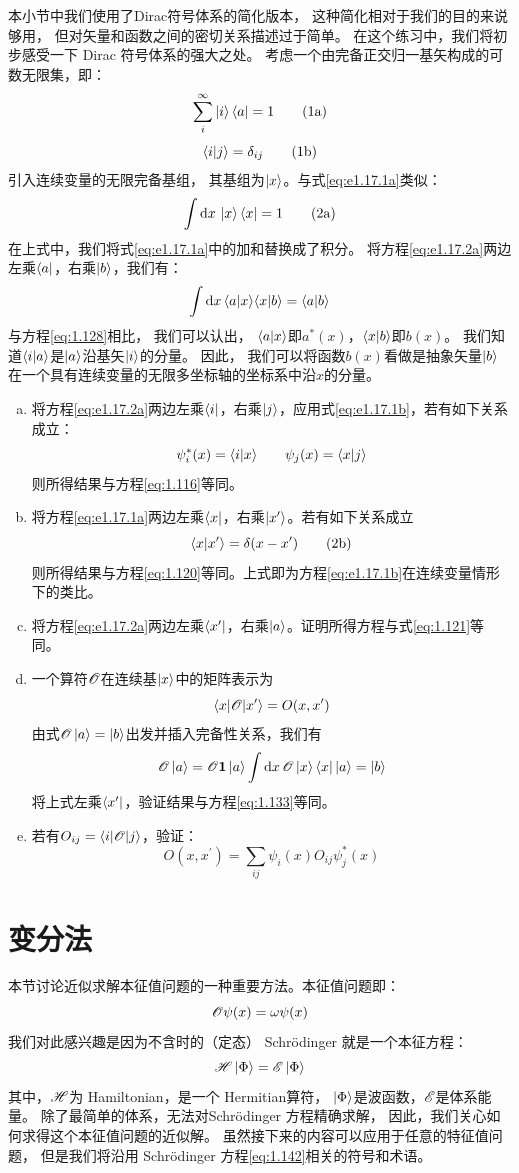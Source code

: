 { 本小节中我们使用了Dirac符号体系的简化版本，
 这种简化相对于我们的目的来说够用，
 但对矢量和函数之间的密切关系描述过于简单。
 在这个练习中，我们将初步感受一下 Dirac 符号体系的强大之处。
 考虑一个由完备正交归一基矢构成的可数无限集，即：
\[
     \sum_i^\infty \Ket{i}\Bra{a} = 1
     \tag{1a}\label{eq:e1.17.1a}
\]
\[
     \langle i \vert j \rangle = \delta_{ij}
     \tag{1b}\label{eq:e1.17.1b}
\]
引入连续变量的无限完备基组，
其基组为$\Ket{x}$。与式\eqref{eq:e1.17.1a}类似：
\[
\int\mathrm{d}x\,\Ket{x}\Bra{x} = 1
\tag{2a}\label{eq:e1.17.2a}
\]
在上式中，我们将式\eqref{eq:e1.17.1a}中的加和替换成了积分。
将方程\eqref{eq:e1.17.2a}两边左乘$\Bra{a}$，右乘$\Ket{b}$，我们有：
\[
\int\mathrm{d}x\, \langle a \vert x \rangle\langle x \vert b \rangle = \langle a \vert b \rangle
\]
与方程\eqref{eq:1.128}相比，
我们可以认出，
$\langle a \vert x \rangle$即$a^\ast(x)$，$\langle x \vert b \rangle$即$b(x)$。
我们知道$\langle i \vert a \rangle$是$\Ket{a}$沿基矢$\Ket{i}$的分量。
因此，
我们可以将函数$b(x)$看做是抽象矢量$\Ket{b}$在一个具有连续变量的无限多坐标轴的坐标系中沿$x$的分量。
\begin{enumerate}[a.]
 \item 将方程\eqref{eq:e1.17.2a}两边左乘$\Bra{i}$，右乘$\Ket{j}$，应用式\eqref{eq:e1.17.1b}，若有如下关系成立：
 \[
 \psi^\ast_i(x) = \langle i \vert x \rangle \qquad \psi_j(x) = \langle x \vert j \rangle
 \]
 则所得结果与方程\eqref{eq:1.116}等同。
 \item 将方程\eqref{eq:e1.17.1a}两边左乘$\Bra{x}$，右乘$\Ket{x^\prime}$。若有如下关系成立
 \[
 \langle x \vert x^\prime \rangle = \delta(x - x^\prime)
 \tag{2b} \label{eq:e1.17.2b}
 \]
 则所得结果与方程\eqref{eq:1.120}等同。上式即为方程\eqref{eq:e1.17.1b}在连续变量情形下的类比。
 \item 将方程\eqref{eq:e1.17.2a}两边左乘$\Bra{x^\prime}$，右乘$\Ket{a}$。证明所得方程与式\eqref{eq:1.121}等同。
 \item 一个算符$\mathscr{O}$在连续基$\Ket{x}$中的矩阵表示为
 \[\left\langle x\middle\vert \mathscr{O} \middle\vert x^\prime\right\rangle = O(x, x^\prime)\]
 由式$\mathscr{O}\Ket{a} = \Ket{b}$出发并插入完备性关系，我们有
 \[\mathscr{O}\Ket{a} = \mathscr{O}\mathbf{1}\Ket{a} \int\mathrm{d}x\,\mathscr{O}\Ket{x}\Bra{x}\Ket{a} = \Ket{b}\]
 将上式左乘$\Bra{x^\prime}$，验证结果与方程\eqref{eq:1.133}等同。
 \item 若有$O_{ij} = \left\langle i\middle\vert \mathscr{O} \middle\vert j\right\rangle$，验证：
 \[O(x,x^\prime) = \sum_{ij}\psi_i(x)O_{ij}\psi_j^\ast(x)\]
\end{enumerate}
}


\section{变分法}
\label{sec:1.3}
本节讨论近似求解本征值问题的一种重要方法。本征值问题即：
\begin{equation}
 \mathscr{O}\psi(x) =\omega\psi(x)
 \label{eq:1.141}
\end{equation}
我们对此感兴趣是因为不含时的（定态） Schr\"{o}dinger 就是一个本征方程：
\begin{equation}
 \mathscr{H} \Ket{\Phi} = \mathscr{E} \Ket{\Phi}
 \label{eq:1.142}
\end{equation}
其中，$\mathscr{H}$为 Hamiltonian，是一个 Hermitian算符，
$\Ket{\Phi}$是波函数，$\mathscr{E}$是体系能量。
除了最简单的体系，无法对Schr\"odinger 方程精确求解，
因此，我们关心如何求得这个本征值问题的近似解。
虽然接下来的内容可以应用于任意的特征值问题，
但是我们将沿用 Schr\"odinger 方程\eqref{eq:1.142}相关的符号和术语。

